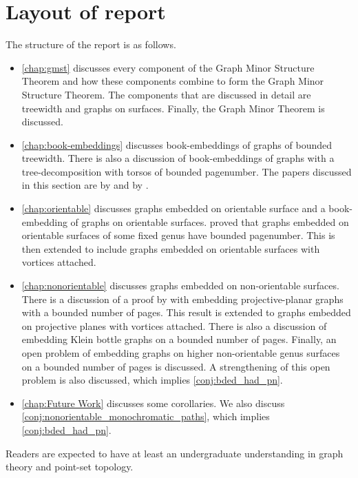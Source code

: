 \section{Layout of report}
The structure of the report is as follows.
\begin{itemize}
	\item \cref{chap:gmst} discusses every component of the Graph Minor Structure Theorem and how these components combine to form the Graph Minor Structure Theorem. The components that are discussed in detail are treewidth and graphs on surfaces. Finally, the Graph Minor Theorem is discussed.
	\item \cref{chap:book-embeddings} discusses book-embeddings of graphs of bounded treewidth. There is also a discussion of book-embeddings of graphs with a tree-decomposition with torsos of bounded pagenumber. The papers discussed in this section are by \textcite{hickingbothamStackNumberCliqueSum2023} and by \textcite{ganleyPagenumberTrees2001}. 
	\item \cref{chap:orientable} discusses graphs embedded on orientable surface and a book-embedding of graphs on orientable surfaces. \textcite{heathPagenumberGenusGraphs1992} proved that graphs embedded on orientable surfaces of some fixed genus have bounded pagenumber. This is then extended to include graphs embedded on orientable surfaces with vortices attached. 
	\item \cref{chap:nonorientable} discusses graphs embedded on non-orientable surfaces. There is a discussion of a proof by \textcite{nakamotoBookEmbeddingProjectiveplanar2015} with embedding projective-planar graphs with a bounded number of pages. This result is extended to graphs embedded on projective planes with vortices attached. There is also a discussion of embedding Klein bottle graphs on a bounded number of pages. Finally, an open problem of embedding graphs on higher non-orientable genus surfaces on a bounded number of pages is discussed. A strengthening of this open problem is also discussed, which implies \cref{conj:bded_had_pn}.
	\item \cref{chap:Future Work} discusses some corollaries. We also discuss \cref{conj:nonorientable_monochromatic_paths}, which implies \cref{conj:bded_had_pn}. 
\end{itemize}

Readers are expected to have at least an undergraduate understanding in graph theory and point-set topology. 

